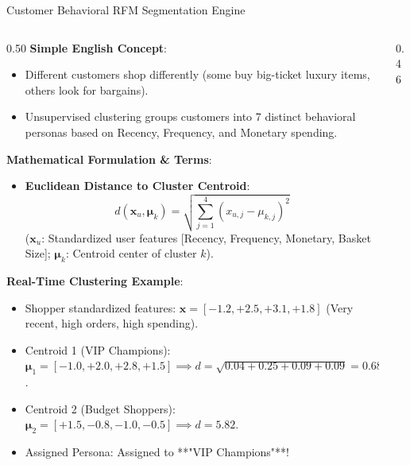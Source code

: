 \documentclass[10pt]{beamer}
\begin{document}
\begin{frame}[fragile]{Customer Behavioral RFM Segmentation Engine}
\begin{columns}[T]
    \begin{column}{0.50\textwidth}
        {\color{brandred}\textbf{Simple English Concept}}:
        \begin{itemize}\scriptsize
            \item Different customers shop differently (some buy big-ticket luxury items, others look for bargains).
            \item Unsupervised clustering groups customers into 7 distinct behavioral personas based on Recency, Frequency, and Monetary spending.
        \end{itemize}
        {\color{brandorange}\textbf{Mathematical Formulation \& Terms}}:
        \begin{itemize}\scriptsize
            \item \textbf{Euclidean Distance to Cluster Centroid}:
            $$d(\mathbf{x}_u, \mathbf{\mu}_k) = \sqrt{\sum_{j=1}^4 (x_{u, j} - \mu_{k, j})^2}$$
            ($\mathbf{x}_u$: Standardized user features [Recency, Frequency, Monetary, Basket Size]; $\mathbf{\mu}_k$: Centroid center of cluster $k$).
        \end{itemize}
        {\color{brandred}\textbf{Real-Time Clustering Example}}:
        \begin{itemize}\scriptsize
            \item Shopper standardized features: $\mathbf{x} = [-1.2, +2.5, +3.1, +1.8]$ (Very recent, high orders, high spending).
            \item Centroid 1 (VIP Champions): $\mathbf{\mu}_1 = [-1.0, +2.0, +2.8, +1.5] \implies d = \sqrt{0.04 + 0.25 + 0.09 + 0.09} = \mathbf{0.686}$.
            \item Centroid 2 (Budget Shoppers): $\mathbf{\mu}_2 = [+1.5, -0.8, -1.0, -0.5] \implies d = \mathbf{5.82}$.
            \item Assigned Persona: Assigned to **"VIP Champions"**!
        \end{itemize}
    \end{column}%
    \begin{column}{0.46\textwidth}
\begin{lstlisting}[language=Python]

\end{lstlisting}
\end{column}
\end{columns}
\end{frame}
\end{document}
